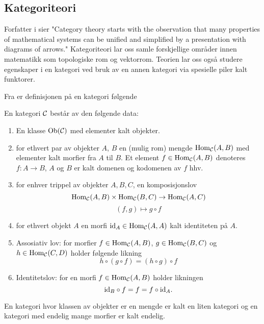\subsection{Kategoriteori}\label{Ssek:Katgoriteori}

Forfatter i \citep[introduksjon]{Lane2010} sier "Category
theory starts with the observation that many properties of
mathematical systems can be unified and simplified by
a presentation with diagrams of arrows." Kategoriteori lar
oss samle forskjellige områder innen matematikk som
topologiske rom og vektorrom. Teorien lar oss også studere
egenskaper i en kategori ved bruk av en annen kategori via
spesielle piler kalt funktorer.

Fra \citep[definisjon 1.2.1]{Agore2023} er definisjonen på en kategori
følgende

\begin{definisjon}\label{def:Kategori}
  En kategori $\mathcal{C}$ består av den følgende data:
  \begin{enumerate}
    \item En klasse $\textnormal{Ob}(\mathcal{C})$ med elementer kalt
      objekter.
    \item for ethvert par av objekter $A$, $B$ en (mulig
      rom) mengde $\textnormal{Hom}_{\mathcal{C}}(A,B)$ med elementer kalt
      morfier fra $A$ til $B$. Et element
      $f\in\textnormal{Hom}_{\mathcal{C}}(A,B)$ denoteres $f: A\to B$, $A$ og
      $B$ er kalt domenen og kodomenen av $f$ hhv.
    \item for enhver trippel av objekter $A,B,C$, en
      komposisjonslov
      \[\textnormal{Hom}_{\mathcal{C}}(A,B)\times\textnormal{Hom}_{\mathcal{C}}(B,C)\to\textnormal{Hom}_{\mathcal{C}}(A,C)\]
      \[(f,g)\mapsto g\circ f\]
    \item for ethvert objekt $A$ en morfi
      $\textnormal{id}_A\in\textnormal{Hom}_{\mathcal{C}}(A,A)$ kalt identiteten på $A$.
    \item Assosiativ lov: for morfier
      $f\in\textnormal{Hom}_{\mathcal{C}}(A,B)$, $g\in\textnormal{Hom}_{\mathcal{C}}(B,C)$ og
      $h\in\textnormal{Hom}_{\mathcal{C}}(C,D)$ holder følgende likning
      \[h\circ(g\circ f) = (h\circ g)\circ f\]
    \item Identitetslov: for en morfi
      $f\in\textnormal{Hom}_{\mathcal{C}}(A,B)$ holder likningen
      \[\textnormal{id}_B\circ f = f = f\circ \textnormal{id}_A.\]
  \end{enumerate}
  En kategori hvor klassen av objekter er en mengde er
  kalt en liten kategori og en kategori med endelig mange
  morfier er kalt endelig.
\end{definisjon}

